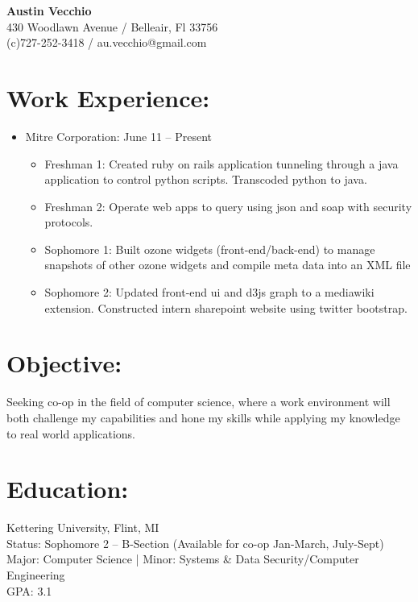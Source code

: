 \documentclass{res}
\begin{document}
\begin{center}
\LARGE{\textbf{Austin Vecchio}}\\
\normalsize{
430 Woodlawn Avenue / Belleair, Fl 33756\\
(c)727-252-3418 / au.vecchio@gmail.com
}
\end{center}

\section{Work Experience:}
\begin{itemize}
\item Mitre Corporation: \hspace{45pt} June 11 – Present
\begin{itemize}[label=$\circ$]
\item Freshman 1: Created ruby on rails application tunneling through a java application to control python scripts. Transcoded python to java.
\item Freshman 2: Operate web apps to query using json and soap with security protocols.
\item Sophomore 1: Built ozone widgets (front-end/back-end) to manage snapshots of other ozone widgets and compile meta data into an XML file
\item Sophomore 2: Updated front-end ui and d3js graph to a mediawiki extension. Constructed intern sharepoint website using twitter bootstrap.
\end{itemize}
\end{itemize}

\section{Objective:}
Seeking co-op in the field of computer science, where a work environment will both challenge my capabilities and hone my skills while applying my knowledge to real world applications.\\

\section{Education:}
Kettering University, Flint, MI\\
Status: Sophomore 2 – B-Section (Available for co-op Jan-March, July-Sept)\\
Major: Computer Science %
|   Minor: Systems \& Data Security/Computer Engineering\\
GPA: 3.1
\end{document}

